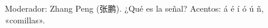 \documentclass{article}
\begin{document}
Moderador: Zhang Peng (张鹏). ¿Qué es la señal? Acentos: á é í ó ú ñ, «comillas».
\end{document}
